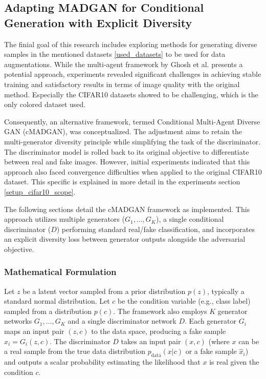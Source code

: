 \newcommand{\definegenerator}{\texttt{define\_generator}}
\newcommand{\definediscriminator}{\texttt{define\_discriminator}}
\newcommand{\lambdadiv}{\lambda_{\text{div}}}
\subsection[Adapting MAD-GAN for Conditional Generation with Explicit Diversity - CMADGAN]{Adapting MADGAN for Conditional Generation with Explicit Diversity}
\label{theoretical_cmadgan}

The finial goal of this research includes exploring methods for generating diverse samples in the mentioned datasets \ref{used_datasets} to be used for data augmentations. While the multi-agent framework by Ghosh et al. presents a potential approach, experiments revealed significant challenges in achieving stable training and satisfactory results in terms of image quality with the original method. Especially the CIFAR10 datasets showed to be challenging, which is the only colored dataset used.

Consequently, an alternative framework, termed Conditional Multi-Agent Diverse GAN (cMADGAN), was conceptualized. The adjustment aims to retain the multi-generator diversity principle while simplifying the task of the discriminator. The discriminator model is rolled back to its original objective to differentiate between real and fake images. However, initial experiments indicated that this approach also faced convergence difficulties when applied to the original CIFAR10 dataset. This specific is explained in more detail in the experiments section \ref{setup_cifar10_scope}.

The following sections detail the cMADGAN framework as implemented. This approach utilizes multiple generators (\( G_1, \dots, G_K \)), a single conditional discriminator (\( D \)) performing standard real/fake classification, and incorporates an explicit diversity loss between generator outputs alongside the adversarial objective.

\subsubsection{Mathematical Formulation}
\label{theoretical_cmadgan_math}

Let \( z \) be a latent vector sampled from a prior distribution \( p(z) \), typically a standard normal distribution. Let \( c \) be the condition variable (e.g., class label) sampled from a distribution \( p(c) \). The framework also employs \( K \) generator networks \( G_1, \dots, G_K \) and a single discriminator network \( D \). Each generator \( G_i \) maps an input pair \( (z, c) \) to the data space, producing a fake sample \( \hat{x}_i = G_i(z, c) \). The discriminator \( D \) takes an input pair \( (x, c) \) (where \( x \) can be a real sample from the true data distribution \( p_{\text{data}}(x|c) \) or a fake sample \( \hat{x}_i \)) and outputs a scalar probability estimating the likelihood that \( x \) is real given the condition \( c \).

